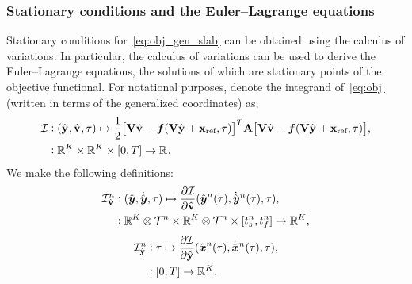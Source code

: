 \subsubsection{Stationary conditions and the Euler--Lagrange equations}
Stationary conditions for~\eqref{eq:obj_gen_slab} can be obtained using the
calculus of variations. In particular, the calculus of variations can be used
to derive the Euler--Lagrange equations, the solutions of which are stationary 
points of the objective functional. For notational purposes, denote the
integrand of~\eqref{eq:obj} (written in terms of the generalized
coordinates) as, 
\begin{equation}\label{eq:integrand}
\begin{split}
 \minintegrandArg{n} & \vcentcolon
(\genstateyDiscreteArgnt{}, \genstateyDiscreteDotArgnt{},\timeDummy) \mapsto \frac{1}{2} \big[
\basisspace \genstateyDiscreteDotArgnt{} - \velocity(\basisspace \genstateyDiscreteArgnt{}
+ \stateIntercept,\timeDummy ) \big]^T \stweightingMatArgt{n}{t} \big[
\basisspace \genstateyDiscreteDotArgnt{}  - \velocity(\basisspace \genstateyDiscreteArgnt{} +
\stateIntercept,\timeDummy) \big], \\ & \vcentcolon \RR{\romdim} \times \RR{\romdim} \times [0,T]
 \rightarrow \RR{} .  
\end{split}
\end{equation}
We make the following definitions:
\begin{equation}
\begin{split}
\dIdV^n  & \vcentcolon
(\genstatey , \genstateyDot, \timeDummy) \mapsto \frac{\partial \minintegrand}{\partial \genstateyDiscreteDot} (\genstateyArg{n}{\timeDummy}, \genstateyDotArg{n}{\timeDummy},\timeDummy), \\ 
& \vcentcolon  \RR{\romdim} \otimes \timeSpaceArg{n} \times \RR{\romdim} \otimes \timeSpaceArg{n} \times [\timeStartArg{n},\timeEndArg{n}]
 \rightarrow \RR{\romdim} ,
\end{split}
\end{equation}
\begin{equation}
\begin{split}
\dIdY^n  & \vcentcolon
\timeDummy \mapsto \frac{\partial \minintegrand}{\partial \genstateyDiscrete} (\genstateArg{n}{\timeDummy}, \genstateDotArg{n}{\timeDummy},\timeDummy), \\ 
& \vcentcolon  [0,T]
 \rightarrow \RR{\romdim} .  
\end{split}
\end{equation}
